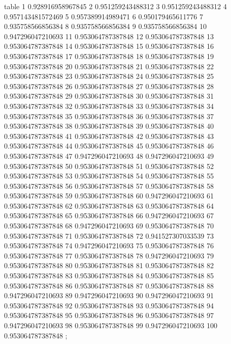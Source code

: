 \nextgroupplot[title=Seed 10,
height=\figheight,
legend cell align={left},
legend columns=-1,
legend style={
  fill opacity=0.8,
  draw opacity=1,
  text opacity=1,
  at={(-0.20,1.36)},%
  anchor=south west,
  draw=white!80!black
},
minor xtick={25, 75},
minor ytick={},
tick align=outside,
tick pos=left,
width=\figwidth,
x grid style={white!69.0196078431373!black},
xlabel={Eval. Steps},
xminorgrids,
xmajorgrids,
xmin=-3.95, xmax=104.95,
xtick style={color=black},
xtick={-25,0,50,100,125},
xticklabels={-25,0,50,100,125},
y grid style={white!69.0196078431373!black},
ylabel={ACC (\%)},
ymajorgrids,
ymin=0.895982454991159, ymax=0.960314079751296,
ytick style={color=black},
ytick={0.89,0.9,0.91,0.92,0.93,0.94,0.95,0.96,0.97},
yticklabels={89,90,91,92,93,94,95,96,97}
]
table {%
1 0.928916958967845
2 0.951259243488312
3 0.951259243488312
4 0.957143481572469
5 0.957389914989471
6 0.950179465611776
7 0.935758566856384
8 0.935758566856384
9 0.935758566856384
10 0.947296047210693
11 0.953064787387848
12 0.953064787387848
13 0.953064787387848
14 0.953064787387848
15 0.953064787387848
16 0.953064787387848
17 0.953064787387848
18 0.953064787387848
19 0.953064787387848
20 0.953064787387848
21 0.953064787387848
22 0.953064787387848
23 0.953064787387848
24 0.953064787387848
25 0.953064787387848
26 0.953064787387848
27 0.953064787387848
28 0.953064787387848
29 0.953064787387848
30 0.953064787387848
31 0.953064787387848
32 0.953064787387848
33 0.953064787387848
34 0.953064787387848
35 0.953064787387848
36 0.953064787387848
37 0.953064787387848
38 0.953064787387848
39 0.953064787387848
40 0.953064787387848
41 0.953064787387848
42 0.953064787387848
43 0.953064787387848
44 0.953064787387848
45 0.953064787387848
46 0.953064787387848
47 0.947296047210693
48 0.947296047210693
49 0.953064787387848
50 0.953064787387848
51 0.953064787387848
52 0.953064787387848
53 0.953064787387848
54 0.953064787387848
55 0.953064787387848
56 0.953064787387848
57 0.953064787387848
58 0.953064787387848
59 0.953064787387848
60 0.947296047210693
61 0.953064787387848
62 0.953064787387848
63 0.953064787387848
64 0.953064787387848
65 0.953064787387848
66 0.947296047210693
67 0.953064787387848
68 0.947296047210693
69 0.953064787387848
70 0.953064787387848
71 0.953064787387848
72 0.941527307033539
73 0.953064787387848
74 0.947296047210693
75 0.953064787387848
76 0.953064787387848
77 0.953064787387848
78 0.947296047210693
79 0.953064787387848
80 0.953064787387848
81 0.953064787387848
82 0.953064787387848
83 0.953064787387848
84 0.953064787387848
85 0.953064787387848
86 0.953064787387848
87 0.953064787387848
88 0.947296047210693
89 0.947296047210693
90 0.947296047210693
91 0.953064787387848
92 0.953064787387848
93 0.953064787387848
94 0.953064787387848
95 0.953064787387848
96 0.953064787387848
97 0.947296047210693
98 0.953064787387848
99 0.947296047210693
100 0.953064787387848
};
